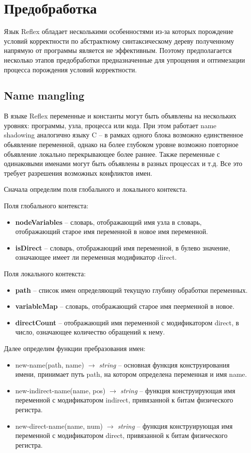 
\chapter{Предобработка}
Язык Reflex обладает несколькими особенностями из-за которых порождение условий корректности по абстрактному синтаксическому дереву полученному напрямую от программы является не эффективным. Поэтому предполагается несколько этапов предобработки предназначенные для упрощения и оптимезации процесса порождения условий корректности.

\section{Name mangling}
В языке Reflex переменные и константы могут быть объявлены на нескольких уровнях: программы, узла, процесса или кода. При этом работает name shadowing аналогично языку C -- в рамках одного блока возможно единственное обьявление переменной, однако на более глубоком уровне возможно повторное объявление локально перекрывающее более раннее. Также переменные с одинаковыми именами могут быть объявлены в разных процессах и т.д. Все это требует разрешения возможных конфликтов имен.

Сначала определим поля глобального и локального контекста.

Поля глобального контекста:
\begin{itemize}
    \item \textbf{nodeVariables} -- словарь, отображающий имя узла в словарь, отображающий старое имя переменной в новое имя переменной.
    \item \textbf{isDirect} -- словарь, отображающий имя переменной, в булево значение, означающее имеет ли переменная модификатор direct. 
\end{itemize}
Поля локального контекста:
\begin{itemize}
    \item \textbf{path} -- список имен определяющий текущую глубину обработки переменных.
    \item \textbf{variableMap} -- словарь, отображающий старое имя пеерменной в новое.
    \item \textbf{directCount} -- отображающий имя переменной с модификатором direct, в число, означающее количество обращений к нему. 
\end{itemize}

Далее определим функции пребразования имен:
\begin{itemize}
    \item new-name(path, name) $\rightarrow$ \textit{string} -- основная функция конструирования имени, принимает путь path, на котором определена переменная и имя name.
    \item new-indirect-name(name, pos) $\rightarrow$ \textit{string} -- функция конструирующая имя переменной с модификатором indirect, привязанной к битам физического регистра.
    \item new-direct-name(name, num) $\rightarrow$ \textit{string} -- функция конструирующая имя переменной с модификатором direct, привязанной к битам физического регистра.
\end{itemize}

